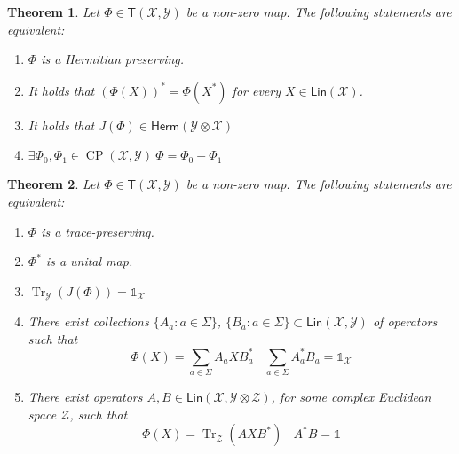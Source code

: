 \documentclass[aps,pra,onecolumn,notitlepage,superscriptaddress]{revtex4-1}
\newcommand{\spc}[1]{\mathcal{#1}}
\newcommand{\Lin}{\mathsf{Lin}}
\newcommand{\Herm}{\mathsf{Herm}}
\newcommand{\T}{\mathsf{T}}
\newcommand{\Tr}{\operatorname{Tr}}
\newcommand{\op}[1]{\operatorname{#1}}
\newcommand\I{\mathds{1}}
\newtheorem{theo}{Theorem}
\begin{document}
    \begin{theo}
        Let $\Phi \in \T(\spc X, \spc Y)$ be a non-zero map. The following statements are equivalent:
        \begin{enumerate}
            \item $\Phi$ is a Hermitian preserving.
            \item It holds that $(\Phi(X))^* = \Phi(X^*)$ for every $X \in \Lin(\spc X)$.
            \item It holds that $J(\Phi) \in \Herm(\spc Y \otimes \spc X)$
            \item $\exists \Phi_0, \Phi_1 \in \op{CP}(\spc X, \spc Y) \ \Phi = \Phi_0 - \Phi_1$
        \end{enumerate}
    \end{theo}

    \begin{theo}
        Let $\Phi \in \T(\spc X, \spc Y)$ be a non-zero map. The following statements are equivalent:
        \begin{enumerate}
            \item $\Phi$ is a trace-preserving.
            \item $\Phi^*$ is a unital map.
            \item $\Tr_{\spc Y}(J(\Phi)) = \I_{\spc X}$
            \item There exist collections $\{A_a : a \in \Sigma\}$, $\{B_a : a \in \Sigma\} \subset \Lin(\spc X, \spc Y)$ of
            operators such that
            \begin{equation}
                \Phi(X) = \sum_{a \in \Sigma} A_a X B_a^* \ \ \ \ \sum_{a \in \Sigma} A_a^* B_a = \I_{\spc X}
            \end{equation}
            \item There exist operators $A,B \in \Lin(\spc X, \spc Y\otimes \spc Z)$, for some complex Euclidean space $\spc Z$, such that
            \begin{equation}
                \Phi(X) = \Tr_{\spc Z}(AXB^*) \ \ \ \ A^*B = \I
            \end{equation}
        \end{enumerate}
    \end{theo}
\end{document}
